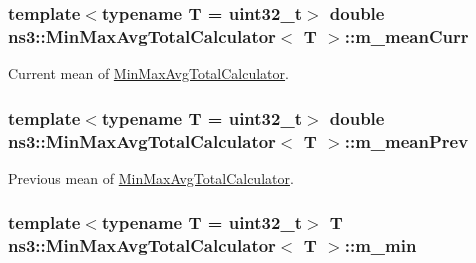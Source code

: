 \subsubsection[{\texorpdfstring{m\+\_\+mean\+Curr}{m_meanCurr}}]{\setlength{\rightskip}{0pt plus 5cm}template$<$typename T = uint32\+\_\+t$>$ double {\bf ns3\+::\+Min\+Max\+Avg\+Total\+Calculator}$<$ T $>$\+::m\+\_\+mean\+Curr\hspace{0.3cm}{\ttfamily [protected]}}\hypertarget{classns3_1_1MinMaxAvgTotalCalculator_af44053de695179f32d0ae94fba0d49b4}{}\label{classns3_1_1MinMaxAvgTotalCalculator_af44053de695179f32d0ae94fba0d49b4}


Current mean of \hyperlink{classns3_1_1MinMaxAvgTotalCalculator}{Min\+Max\+Avg\+Total\+Calculator}. 

\subsubsection[{\texorpdfstring{m\+\_\+mean\+Prev}{m_meanPrev}}]{\setlength{\rightskip}{0pt plus 5cm}template$<$typename T = uint32\+\_\+t$>$ double {\bf ns3\+::\+Min\+Max\+Avg\+Total\+Calculator}$<$ T $>$\+::m\+\_\+mean\+Prev\hspace{0.3cm}{\ttfamily [protected]}}\hypertarget{classns3_1_1MinMaxAvgTotalCalculator_aedba5cd8e01f5f85b3f092943f21a024}{}\label{classns3_1_1MinMaxAvgTotalCalculator_aedba5cd8e01f5f85b3f092943f21a024}


Previous mean of \hyperlink{classns3_1_1MinMaxAvgTotalCalculator}{Min\+Max\+Avg\+Total\+Calculator}. 

\subsubsection[{\texorpdfstring{m\+\_\+min}{m_min}}]{\setlength{\rightskip}{0pt plus 5cm}template$<$typename T = uint32\+\_\+t$>$ T {\bf ns3\+::\+Min\+Max\+Avg\+Total\+Calculator}$<$ T $>$\+::m\+\_\+min\hspace{0.3cm}{\ttfamily [protected]}}\hypertarget{classns3_1_1MinMaxAvgTotalCalculator_a2355225c9e982b436171f46702538489}{}\label{classns3_1_1MinMaxAvgTotalCalculator_a2355225c9e982b436171f46702538489}


